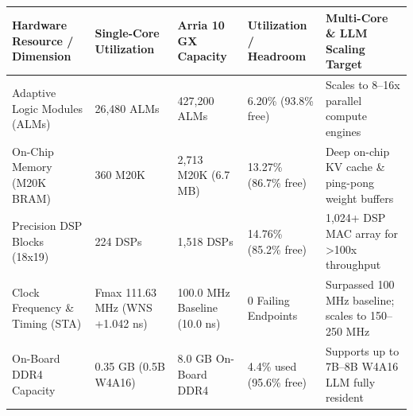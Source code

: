 \documentclass[11pt,a4paper]{article}
\begin{document}
{\footnotesize\renewcommand{\arraystretch}{1.14}\begin{longtable}{@{}L{0.21\textwidth}L{0.16\textwidth}L{0.16\textwidth}L{0.15\textwidth}L{0.22\textwidth}@{}}\toprule

\textbf{Hardware Resource /\allowbreak{} Dimension} & \textbf{Single-Core Utilization} & \textbf{Arria 10 GX Capacity} & \textbf{Utilization /\allowbreak{} Headroom} & \textbf{Multi-Core \& LLM Scaling Target}\\\midrule\endhead

Adaptive Logic Modules (\allowbreak{}ALMs)\allowbreak{} & 26,\allowbreak{}480 ALMs & 427,\allowbreak{}200 ALMs & 6.20\% (\allowbreak{}93.8\% free)\allowbreak{} & Scales to 8--16x parallel compute engines\\[2pt]

On-Chip Memory (\allowbreak{}M20K BRAM)\allowbreak{} & 360 M20K & 2,\allowbreak{}713 M20K (\allowbreak{}6.7 MB)\allowbreak{} & 13.27\% (\allowbreak{}86.7\% free)\allowbreak{} & Deep on-chip KV cache \& ping-pong weight buffers\\[2pt]

Precision DSP Blocks (\allowbreak{}18x19)\allowbreak{} & 224 DSPs & 1,\allowbreak{}518 DSPs & 14.76\% (\allowbreak{}85.2\% free)\allowbreak{} & 1,\allowbreak{}024+\allowbreak{} DSP MAC array for >100x throughput\\[2pt]

Clock Frequency \& Timing (\allowbreak{}STA)\allowbreak{} & Fmax 111.63 MHz (\allowbreak{}WNS +\allowbreak{}1.042 ns)\allowbreak{} & 100.0 MHz Baseline (\allowbreak{}10.0 ns)\allowbreak{} & 0 Failing Endpoints & Surpassed 100 MHz baseline; scales to 150--250 MHz\\[2pt]

On-Board DDR4 Capacity & 0.35 GB (\allowbreak{}0.5B W4A16)\allowbreak{} & 8.0 GB On-Board DDR4 & 4.4\% used (\allowbreak{}95.6\% free)\allowbreak{} & Supports up to 7B--8B W4A16 LLM fully resident\\[2pt]

\bottomrule\end{longtable}}
\end{document}
